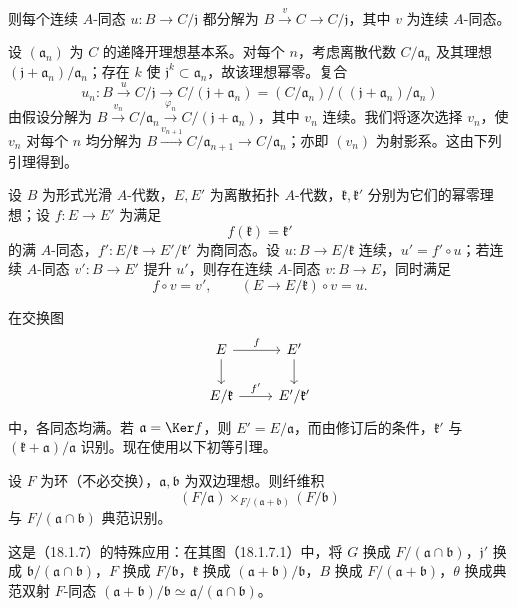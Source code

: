则每个连续 $A$-同态 $u:B\to C/\mathfrak j$ 都分解为 $B\xrightarrow{v}C\to C/\mathfrak j$，其中 $v$ 为连续 $A$-同态。

设 $(\mathfrak a_n)$ 为 $C$ 的递降开理想基本系。对每个 $n$，考虑离散代数 $C/\mathfrak a_n$ 及其理想 $(\mathfrak j+\mathfrak a_n)/\mathfrak a_n$；存在 $k$ 使 $\mathfrak j^k\subset\mathfrak a_n$，故该理想幂零。复合
\[
 u_n:B\xrightarrow{u}C/\mathfrak j\longrightarrow
 C/(\mathfrak j+\mathfrak a_n)
 =(C/\mathfrak a_n)/((\mathfrak j+\mathfrak a_n)/\mathfrak a_n)
\]
由假设分解为 $B\xrightarrow{v_n}C/\mathfrak a_n\xrightarrow{\varphi_n}C/(\mathfrak j+\mathfrak a_n)$，其中 $v_n$ 连续。我们将逐次选择 $v_n$，使 $v_n$ 对每个 $n$ 均分解为 $B\xrightarrow{v_{n+1}}C/\mathfrak a_{n+1}\to C/\mathfrak a_n$；亦即 $(v_n)$ 为射影系。这由下列引理得到。

设 $B$ 为形式光滑 $A$-代数，$E,E'$ 为离散拓扑 $A$-代数，$\mathfrak k,\mathfrak k'$ 分别为它们的幂零理想；设 $f:E\to E'$ 为满足
\[
 f(\mathfrak k)=\mathfrak k'
\]
的满 $A$-同态，$f':E/\mathfrak k\to E'/\mathfrak k'$ 为商同态。设 $u:B\to E/\mathfrak k$ 连续，$u'=f'\circ u$；若连续 $A$-同态 $v':B\to E'$ 提升 $u'$，则存在连续 $A$-同态 $v:B\to E$，同时满足
\[
 f\circ v=v',\qquad (E\to E/\mathfrak k)\circ v=u.
\]

在交换图
\[
\begin{tikzcd}
 E\arrow[r,"f"]\arrow[d]&E'\arrow[d]\\
 E/\mathfrak k\arrow[r,"f'"]&E'/\mathfrak k'
\end{tikzcd}
\]
中，各同态均满。若 $\mathfrak a=\Ker f$，则 $E'=E/\mathfrak a$，而由修订后的条件，$\mathfrak k'$ 与 $(\mathfrak k+\mathfrak a)/\mathfrak a$ 识别。现在使用以下初等引理。

设 $F$ 为环（不必交换），$\mathfrak a,\mathfrak b$ 为双边理想。则纤维积
\[
 (F/\mathfrak a)\times_{F/(\mathfrak a+\mathfrak b)}(F/\mathfrak b)
\]
与 $F/(\mathfrak a\cap\mathfrak b)$ 典范识别。

这是（18.1.7）的特殊应用：在其图（18.1.7.1）中，将 $G$ 换成 $F/(\mathfrak a\cap\mathfrak b)$，$\mathfrak j'$ 换成 $\mathfrak b/(\mathfrak a\cap\mathfrak b)$，$F$ 换成 $F/\mathfrak b$，$\mathfrak k$ 换成 $(\mathfrak a+\mathfrak b)/\mathfrak b$，$B$ 换成 $F/(\mathfrak a+\mathfrak b)$，$\theta$ 换成典范双射 $F$-同态 $(\mathfrak a+\mathfrak b)/\mathfrak b\simeq\mathfrak a/(\mathfrak a\cap\mathfrak b)$。

